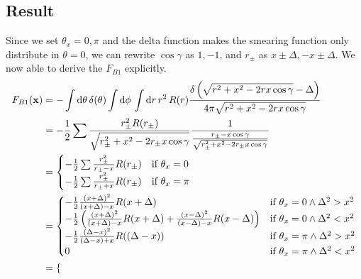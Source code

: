 \documentclass[a4paper,12pt]{article}
\begin{document}
\subsection{Result}
Since we set $\theta_x = 0, \pi$ and the delta function makes the smearing function only distribute in $\theta = 0$, we can rewrite $\cos\gamma$ as $1, -1$, and $r_\pm$ as $x \pm \Delta, - x \pm \Delta$. We now able to derive the $F_{B1}$ explicitly.
\begin{align}
    F_{B1}(\mathbf{x}) &= - \int \mathrm{d}\theta\, \delta(\theta)  \int \mathrm{d}\phi\, \int \mathrm{d}r\, r^2 \, R(r) \frac{\delta\left(\sqrt{r^2 + x^2 - 2rx \cos\gamma} - \Delta\right)}{4\pi \sqrt{r^2 + x^2 - 2rx \cos\gamma}} \notag \\
                       &= - \frac{1}{2} \sum \frac{r_{\pm}^2 R(r_{\pm})}{\sqrt{r_{\pm}^2 + x^2 - 2r_{\pm}x\cos\gamma}} \frac{1}{\frac{r_{\pm} - x\cos\gamma}{\sqrt{r_{\pm}^2 + x^2 - 2r_{\pm}x\cos\gamma}}} \notag \\
                       &= 
                       \begin{cases}
                           - \frac{1}{2} \sum \frac{r_{\pm}^2}{r_{\pm} - x} R(r_{\pm}) & \text{if } \theta_x = 0 \\
                           - \frac{1}{2} \sum \frac{r_{\pm}^2}{r_{\pm} + x} R(r_{\pm}) & \text{if } \theta_x = \pi \\
                       \end{cases} \notag \\
                       &=
                       \begin{cases}
                           - \frac{1}{2} \frac{(x + \Delta)^2}{(x + \Delta) - x} R(x + \Delta) & \text{if } \theta_x = 0 \wedge \Delta^2 > x^2 \\
                           - \frac{1}{2} \left(\frac{(x + \Delta)^2}{(x + \Delta) - x} R(x + \Delta) + \frac{(x - \Delta)^2}{(x - \Delta) - x} R(x - \Delta)\right) & \text{if } \theta_x = 0 \wedge \Delta^2 < x^2 \\
                           - \frac{1}{2} \frac{(\Delta - x)^2}{(\Delta - x) + x} R((\Delta - x)) & \text{if } \theta_x = \pi \wedge \Delta^2 > x^2 \\
                           0 & \text{if } \theta_x = \pi \wedge \Delta^2 < x^2 \\
                       \end{cases} \notag \\
                       &=
                       \begin{cases}

\end{cases}
\end{align}
\end{document}
